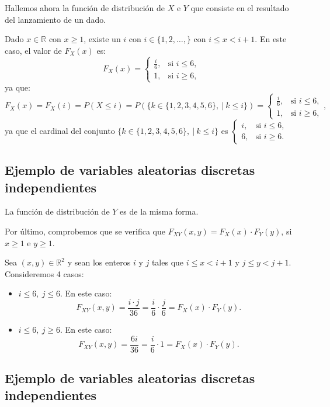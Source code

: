 \documentclass[]{book}
\begin{document}
Hallemos ahora la función de distribución de \(X\) e \(Y\) que consiste en el resultado del lanzamiento de un dado.

Dado \(x\in\mathbb{R}\) con \(x\geq 1\), existe un \(i\) con \(i\in\{1,2,\ldots,\}\) con \(i\leq x <i+1\). En este caso, el valor de \(F_X(x)\) es:
\[
F_X(x)=\begin{cases}
\frac{i}{6}, &\mbox{si }i\leq 6,\\
1, & \mbox{si }i\geq 6,
\end{cases}
\]
ya que:
\[
F_X(x)=F_X(i)=P(X\leq i)=P(\{k\in\{1,2,3,4,5,6\},\ |\ k\leq i\})=\begin{cases}
\frac{i}{6}, &\mbox{si }i\leq 6,\\
1, & \mbox{si }i\geq 6,
\end{cases},
\]
ya que el cardinal del conjunto \(\{k\in\{1,2,3,4,5,6\},\ |\ k\leq i\}\) es \(\begin{cases} i, &\mbox{si }i\leq 6,\\ 6, & \mbox{si }i\geq 6. \end{cases}\)

\hypertarget{ejemplo-de-variables-aleatorias-discretas-independientes-4}{%
\subsection{Ejemplo de variables aleatorias discretas independientes}\label{ejemplo-de-variables-aleatorias-discretas-independientes-4}}

La función de distribución de \(Y\) es de la misma forma.

Por último, comprobemos que se verifica que \(F_{XY}(x,y)=F_X(x)\cdot F_Y(y)\), si \(x\geq 1\) e \(y\geq 1\).

Sea \((x,y)\in\mathbb{R}^2\) y sean los enteros \(i\) y \(j\) tales que \(i\leq x<i+1\) y \(j\leq y<j+1\). Consideremos 4 casos:

\begin{itemize}
\item
  \(i\leq 6, \ j\leq 6\). En este caso:
  \[
  F_{XY}(x,y)=\frac{i\cdot j}{36}=\frac{i}{6}\cdot \frac{j}{6}=F_X(x)\cdot F_Y(y).
  \]
\item
  \(i\leq 6,\ j\geq 6\). En este caso:
  \[
  F_{XY}(x,y)=\frac{6i}{36}=\frac{i}{6}\cdot 1=F_X(x)\cdot F_Y(y).
  \]
\end{itemize}

\hypertarget{ejemplo-de-variables-aleatorias-discretas-independientes-5}{%
\subsection{Ejemplo de variables aleatorias discretas independientes}\label{ejemplo-de-variables-aleatorias-discretas-independientes-5}}
\end{document}
